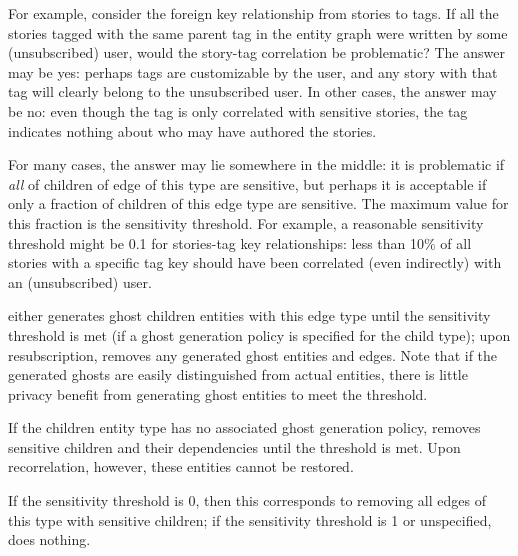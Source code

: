 For example, consider the foreign key relationship from stories to tags. If all
the stories tagged with the same parent tag in the entity graph were written by some
(unsubscribed) user, would the story-tag correlation be problematic? The answer may be yes: 
perhaps tags are customizable by the user, and any story with that tag will clearly
belong to the unsubscribed user. In other cases, the answer may be no: even though the tag is only
correlated with sensitive stories, the tag indicates nothing about who may have authored the stories.

For many cases, the answer may lie somewhere in the middle: it is problematic if \emph{all} of
children of edge of this type are sensitive, but perhaps it is acceptable if only a fraction of
children of this edge type are sensitive. The maximum value for this fraction is the sensitivity threshold.
For example, a reasonable sensitivity threshold might be 0.1 for stories-tag key relationships:
less than 10\% of all stories with a specific tag key should have been correlated (even
indirectly) with an (unsubscribed) user. 

\sys{} either generates ghost children entities with this edge type until the
sensitivity threshold is met (if a ghost generation policy is specified for the child type); upon
resubscription, \sys{} removes any generated ghost entities and edges.
Note that if the generated ghosts are easily distinguished from actual entities, there is
little privacy benefit from generating ghost entities to meet the threshold.

If the children entity type has no associated ghost generation policy, \sys{} removes sensitive children and their dependencies until the threshold is met.
Upon recorrelation, however, these entities cannot be restored.

If the sensitivity threshold is 0, then this corresponds to removing all edges of this type with
sensitive children; if the sensitivity threshold is 1 or unspecified, \sys{} does nothing. 

